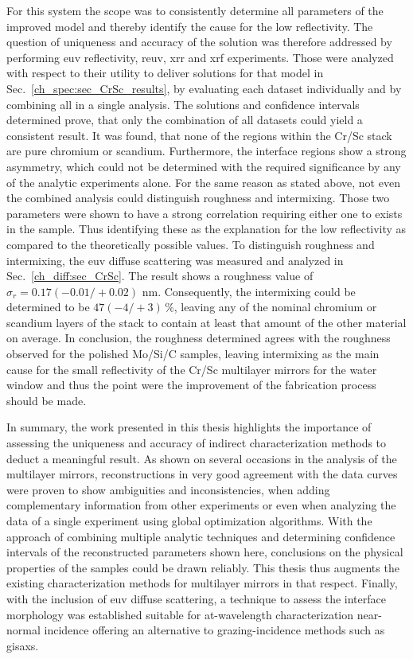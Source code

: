 For this system the scope was to consistently determine all parameters of the improved model and thereby identify the cause for the low reflectivity. The question of uniqueness and accuracy of the solution was therefore addressed by performing \gls{euv} reflectivity, \gls{reuv}, \gls{xrr} and \gls{xrf} experiments. Those were analyzed with respect to their utility to deliver solutions for that model in Sec.~\ref{ch_spec:sec_CrSc_results}, by evaluating each dataset individually and by combining all in a single analysis. The solutions and confidence intervals determined prove, that only the combination of all datasets could yield a consistent result. It was found, that none of the regions within the Cr/Sc stack are pure chromium or scandium. Furthermore, the interface regions show a strong asymmetry, which could not be determined with the required significance by any of the analytic experiments alone. For the same reason as stated above, not even the combined analysis could distinguish roughness and intermixing. Those two parameters were shown to have a strong correlation requiring either one to exists in the sample. Thus identifying these as the explanation for the low reflectivity as compared to the theoretically possible values. To distinguish roughness and intermixing, the \gls{euv} diffuse scattering was measured and analyzed in Sec.~\ref{ch_diff:sec_CrSc}. The result shows a roughness value of $\sigma_r = 0.17  (-0.01/+0.02)$ nm. Consequently, the intermixing could be determined to be $47 (-4/+3)\, \%$, leaving any of the nominal chromium or scandium layers of the stack to contain at least that amount of the other material on average. In conclusion, the roughness determined agrees with the roughness observed for the polished Mo/Si/C samples, leaving intermixing as the main cause for the small reflectivity of the Cr/Sc multilayer mirrors for the water window and thus the point were the improvement of the fabrication process should be made.

In summary, the work presented in this thesis highlights the importance of assessing the uniqueness and accuracy of indirect characterization methods to deduct a meaningful result. As shown on several occasions in the analysis of the multilayer mirrors, reconstructions in very good agreement with the data curves were proven to show ambiguities and inconsistencies, when adding complementary information from other experiments or even when analyzing the data of a single experiment using global optimization algorithms. With the approach of combining multiple analytic techniques and determining confidence intervals of the reconstructed parameters shown here, conclusions on the physical properties of the samples could be drawn reliably. This thesis thus augments the existing characterization methods for multilayer mirrors in that respect. Finally, with the inclusion of \gls{euv} diffuse scattering, a technique to assess the interface morphology was established suitable for at-wavelength characterization near-normal incidence offering an alternative to grazing-incidence methods such as \gls{gisaxs}.


